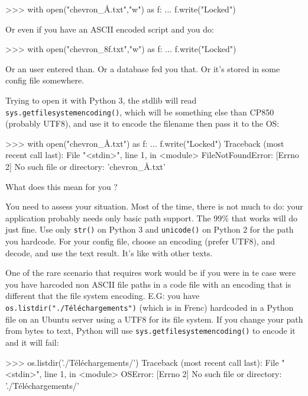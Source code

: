 \begin{py2}
>>> with open("chevron_Å.txt","w") as f:
...    f.write("Locked")
\begin{py2}

Or even if you have an ASCII encoded script and you do:

\begin{py2}
>>> with open("chevron_\x8f.txt","w") as f:
...    f.write("Locked")
\begin{py2}

Or an user entered than. Or a database fed you that. Or it's stored in some config file somewhere.

Trying to open it with Python 3, the stdlib will read \lstinline{sys.getfilesystemencoding()}, which will be something else than CP850 (probably UTF8), and use it to encode the filename then pass it to the OS:

\begin{py2}
>>> with open("chevron_Å.txt") as f:
...    f.write("Locked")
Traceback (most recent call last):
  File "<stdin>", line 1, in <module>
FileNotFoundError: [Errno 2] No such file or directory: 'chevron_Å.txt'
\end{py2}

What does this mean for you ?

You need to assess your situation. Most of the time, there is not much to do: your application probably needs only basic path support. The 99\% that works will do just fine. Use only \lstinline{str()} on Python 3 and \lstinline{unicode()} on Python 2 for the path you hardcode. For your config file, choose an encoding (prefer UTF8), and decode, and use the text result. It's like with other texts.

One of the rare scenario that requires work would be if you were in te case were you have harcoded non ASCII file paths in a code file with an encoding that is different that the file system encoding. E.G: you have \lstinline{os.listdir("./Téléchargements")} (which is  in Frenc) hardcoded in a  Python file on an Ubuntu server using a UTF8 for its file system. If you change your path from bytes to text, Python will use \lstinline{sys.getfilesystemencoding()} to encode it and it will fail:

\begin{py2}
>>> os.listdir('./Téléchargements/')
Traceback (most recent call last):
    File "<stdin>", line 1, in <module>
OSError: [Errno 2] No such file or directory: './Téléchargements/'
\end{py2}


\end{py2}
\end{py2}
\end{py2}
\end{py2}

